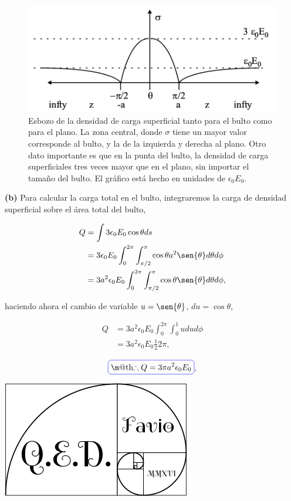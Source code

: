 \documentclass[a4paper,11pt]{article}
\makeatletter
\numberwithin{equation}{section}
\newcommand*{\boxcolor}{blue}
\renewcommand{\boxed}[1]{\textcolor{\boxcolor}{%
\tikz[baseline={([yshift=-1ex]current bounding box.center)}] \node [rectangle, minimum width=1ex,rounded corners,draw] {\normalcolor\m@th$\displaystyle#1$};}}
\makeatother
\begin{document}
\begin{figure}[H]
 \center
 \includegraphics[scale=0.8]{problema5fig1}
 \caption{Esbozo de la densidad de carga superficial tanto para el bulto como 
 para el plano. La zona central, donde $\sigma$ tiene un mayor valor corresponde 
 al bulto, y la de la izquierda y derecha al plano. Otro dato importante es que 
 en la punta del bulto, la densidad de carga superficiales tres veces mayor 
 que en el plano, sin importar el tamaño del bulto. El gráfico está hecho en 
 unidades de $\epsilon_0E_0$.}
\end{figure}

\vspace{.3cm}

\textbf{(b)} Para calcular la carga total en el bulto, integraremos la carga 
de densidad superficial sobre el área total del bulto, 

\begin{align*}
 Q &= \int 3\epsilon_0E_0\cos{\theta}ds \\
   &= 3\epsilon_0E_0 \int_0^{2\pi}\int_{\pi/2}^{\pi} \cos{\theta} a^2 
   \sen{\theta} d\theta d\phi \\
   &= 3a^2\epsilon_0E_0 \int_0^{2\pi}\int_{\pi/2}^{\pi} \cos{\theta}
   \sen{\theta} d\theta d\phi,
\end{align*}

haciendo ahora el cambio de variable $u = \sen{\theta}$, $du = \cos{\theta}$, 

\begin{align*}
 Q &= 3a^2\epsilon_0E_0\int_0^{2\pi}\int_{0}^{1} udud\phi \\
   &= 3a^2\epsilon_0E_0 \frac{1}{2}2\pi,
\end{align*}

\begin{equation}
 \boxed{\therefore Q = 3\pi a^2 \epsilon_0E_0 }.
\end{equation}

\hspace{10cm}\includegraphics[scale=0.2]{logoQED}
\end{document}
